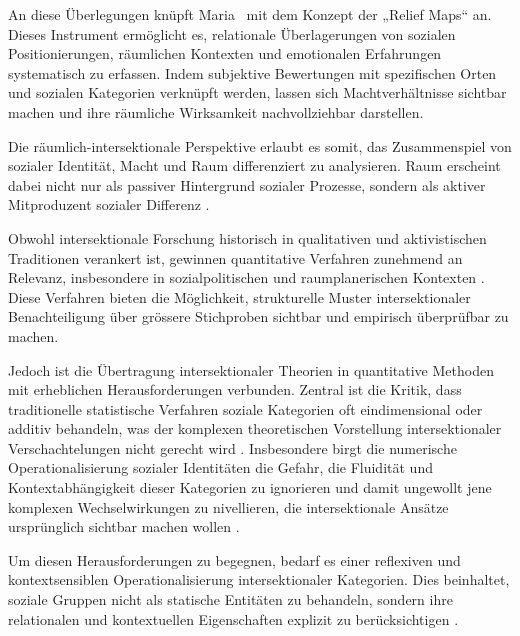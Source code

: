 An diese Überlegungen knüpft Maria~\textcite{rodo-de-zarateDevelopingGeographiesIntersectionality2014, rodo-de-zarateYoungLesbiansNegotiating2015} mit dem Konzept der „Relief Maps“ an. Dieses Instrument ermöglicht es, relationale Überlagerungen von sozialen Positionierungen, räumlichen Kontexten und emotionalen Erfahrungen systematisch zu erfassen. Indem subjektive Bewertungen mit spezifischen Orten und sozialen Kategorien verknüpft werden, lassen sich Machtverhältnisse sichtbar machen und ihre räumliche Wirksamkeit nachvollziehbar darstellen.

Die räumlich-intersektionale Perspektive erlaubt es somit, das Zusammenspiel von sozialer Identität, Macht und Raum differenziert zu analysieren. Raum erscheint dabei nicht nur als passiver Hintergrund sozialer Prozesse, sondern als aktiver Mitproduzent sozialer Differenz \parencite{rodo-de-zarateIntersectionalityFeministGeographies2018}.

\vspace{2em}

Obwohl intersektionale Forschung historisch in qualitativen und aktivistischen Traditionen verankert ist, gewinnen quantitative Verfahren zunehmend an Relevanz, insbesondere in sozialpolitischen und raumplanerischen Kontexten \parencite{bauerIntersectionalityQuantitativeResearch2021}. Diese Verfahren bieten die Möglichkeit, strukturelle Muster intersektionaler Benachteiligung über grössere Stichproben sichtbar und empirisch überprüfbar zu machen.

Jedoch ist die Übertragung intersektionaler Theorien in quantitative Methoden mit erheblichen Herausforderungen verbunden. Zentral ist die Kritik, dass traditionelle statistische Verfahren soziale Kategorien oft eindimensional oder additiv behandeln, was der komplexen theoretischen Vorstellung intersektionaler Verschachtelungen nicht gerecht wird \parencite{hancockWhenMultiplicationDoesnt2007, bowlegInvitedReflectionQuantifying2016}. Insbesondere birgt die numerische Operationalisierung sozialer Identitäten die Gefahr, die Fluidität und Kontextabhängigkeit dieser Kategorien zu ignorieren und damit ungewollt jene komplexen Wechselwirkungen zu nivellieren, die intersektionale Ansätze ursprünglich sichtbar machen wollen \parencite{scottIntersectionalityQuantitativeMethods2017}.

Um diesen Herausforderungen zu begegnen, bedarf es einer reflexiven und kontextsensiblen Operationalisierung intersektionaler Kategorien. Dies beinhaltet, soziale Gruppen nicht als statische Entitäten zu behandeln, sondern ihre relationalen und kontextuellen Eigenschaften explizit zu berücksichtigen \parencite{rodo-de-zarateDevelopingGeographiesIntersectionality2014, websterCenteringSocialtechnicalRelations2021}.


